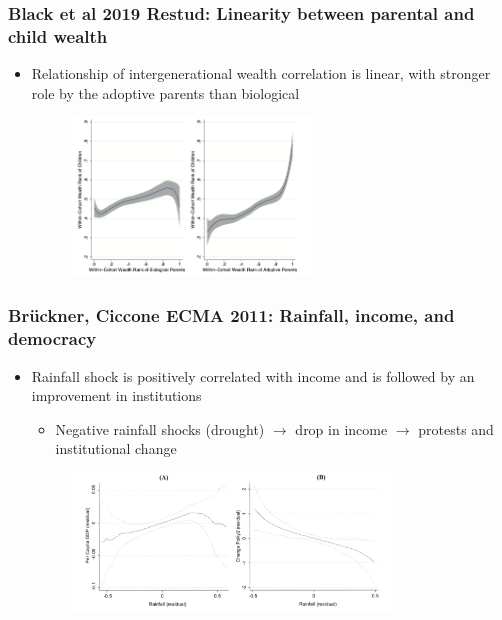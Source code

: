 \documentclass[aspectratio=169]{beamer}
\begin{document}
\begin{frame}
\frametitle{Black et al 2019 Restud: Linearity between parental and child wealth}
 \begin{itemize}
\item Relationship of intergenerational wealth correlation is linear, with stronger role by the adoptive parents than biological
\begin{figure}[H]
\centering
\includegraphics[keepaspectratio, width=0.6\textwidth]{black2.png}
\end{figure}
 \end{itemize}
\end{frame}

\begin{frame}
\frametitle{Brückner, Ciccone ECMA 2011: Rainfall, income, and democracy}
 \begin{itemize}
\item Rainfall shock is positively correlated with income and is followed by an improvement in institutions
\begin{itemize}
\item Negative rainfall shocks (drought) $\to$ drop in income $\to$ protests and institutional change
\end{itemize}
\begin{figure}[H]
\centering
\includegraphics[keepaspectratio, width=0.8\textwidth]{bc_etca.png}
\end{figure}
 \end{itemize}
\end{frame}
\end{document}
